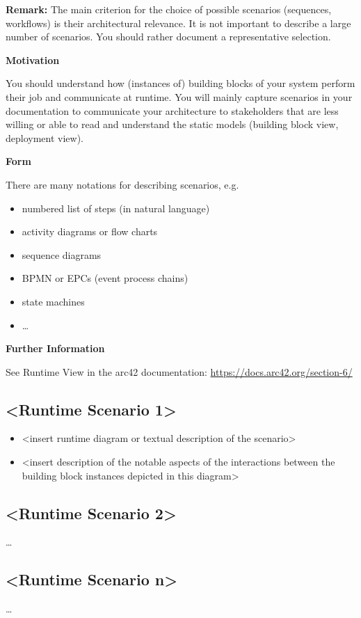 \documentclass[12pt,a4paper]{article}
\newcommand{\minititle}[1]{%
  \par\addvspace{0.6\baselineskip}%
  \noindent\textbf{#1}\par\nobreak%
  \noindent\ignorespaces%
}
\begin{document}
\noindent\textbf{Remark:} The main criterion for the choice of possible scenarios (sequences, workflows) is their architectural relevance. It is not important to describe a large number of scenarios. You should rather document a representative selection.

\minititle{Motivation}
You should understand how (instances of) building blocks of your system perform their job and communicate at runtime. You will mainly capture scenarios in your documentation to communicate your architecture to stakeholders that are less willing or able to read and understand the static models (building block view, deployment view).

\minititle{Form}
There are many notations for describing scenarios, e.g.
\begin{itemize}
  \item numbered list of steps (in natural language)
  \item activity diagrams or flow charts
  \item sequence diagrams
  \item BPMN or EPCs (event process chains)
  \item state machines
  \item \dots
\end{itemize}

\minititle{Further Information}
See Runtime View in the arc42 documentation:
\href{https://docs.arc42.org/section-6/}{https://docs.arc42.org/section-6/}

\subsection{\textless Runtime Scenario 1\textgreater}
\begin{itemize}
  \item \textless insert runtime diagram or textual description of the scenario\textgreater
  \item \textless insert description of the notable aspects of the interactions between the building block instances depicted in this diagram\textgreater
\end{itemize}

\subsection{\textless Runtime Scenario 2\textgreater}
\dots

\subsection{\textless Runtime Scenario n\textgreater}
\dots
\end{document}
